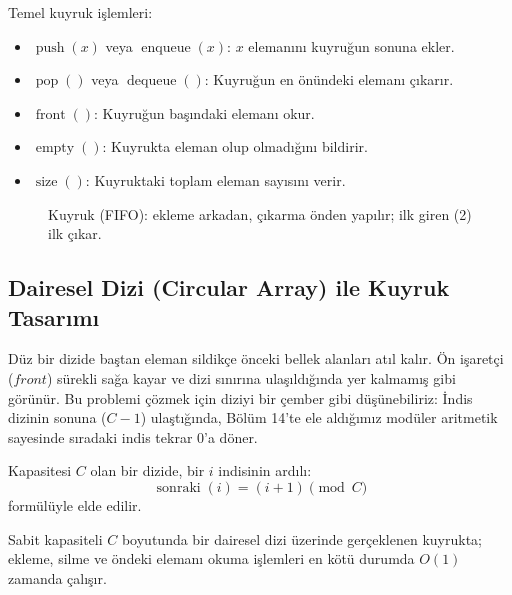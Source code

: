 Temel kuyruk işlemleri:
\begin{itemize}
    \item $\operatorname{push}(x)$ veya $\operatorname{enqueue}(x)$: $x$ elemanını kuyruğun sonuna ekler.
    \item $\operatorname{pop}()$ veya $\operatorname{dequeue}()$: Kuyruğun en önündeki elemanı çıkarır.
    \item $\operatorname{front}()$: Kuyruğun başındaki elemanı okur.
    \item $\operatorname{empty}()$: Kuyrukta eleman olup olmadığını bildirir.
    \item $\operatorname{size}()$: Kuyruktaki toplam eleman sayısını verir.
\end{itemize}

\begin{figure}[ht]
\centering
{}
\caption{Kuyruk (FIFO): ekleme arkadan, çıkarma önden yapılır; ilk giren (2)
ilk çıkar.}
\end{figure}

\subsection{Dairesel Dizi (Circular Array) ile Kuyruk Tasarımı}
Düz bir dizide baştan eleman sildikçe önceki bellek alanları atıl kalır. Ön işaretçi ($front$) sürekli sağa kayar ve dizi sınırına ulaşıldığında yer kalmamış gibi görünür. Bu problemi çözmek için diziyi bir çember gibi düşünebiliriz: İndis dizinin sonuna ($C-1$) ulaştığında, Bölüm 14'te ele aldığımız modüler aritmetik sayesinde sıradaki indis tekrar $0$'a döner.

\begin{definition}
Kapasitesi $C$ olan bir dizide, bir $i$ indisinin ardılı:
\[ \operatorname{sonraki}(i) = (i + 1) \pmod C \]
formülüyle elde edilir.
\end{definition}

\begin{theorem}
Sabit kapasiteli $C$ boyutunda bir dairesel dizi üzerinde gerçeklenen kuyrukta; ekleme, silme ve öndeki elemanı okuma işlemleri en kötü durumda $O(1)$ zamanda çalışır.
\end{theorem}

